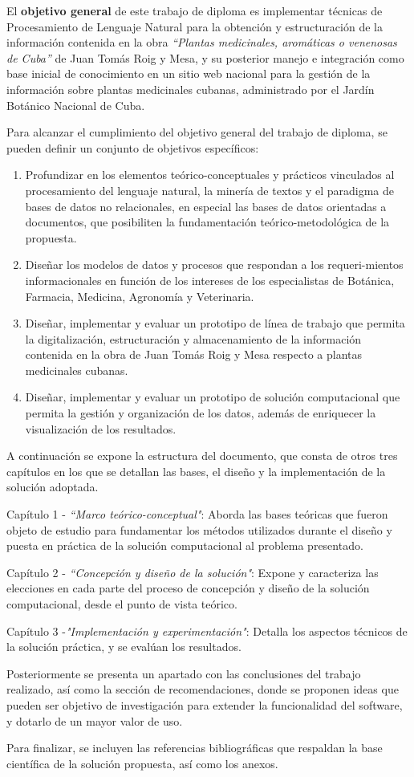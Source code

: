El \textbf{objetivo general} de este trabajo de diploma es implementar técnicas 
de Procesamiento de Lenguaje Natural para la obtención y estructuración de la información 
contenida en la obra \textit{``Plantas medicinales, aromáticas o venenosas de Cuba''} de 
Juan Tomás Roig y Mesa, y su posterior manejo e integración como base inicial de conocimiento 
en un sitio web nacional para la gestión de la información sobre plantas medicinales cubanas, 
administrado por el Jardín Botánico Nacional de Cuba.

Para alcanzar el cumplimiento del objetivo general del trabajo de diploma, se pueden 
definir un conjunto de objetivos específicos:
\begin{enumerate}
    \item Profundizar en los elementos teórico-conceptuales y prácticos vinculados al 
    procesamiento del lenguaje natural, la minería de textos y el paradigma de 
    bases de datos no relacionales, en especial las bases de datos orientadas 
    a documentos, que posibiliten la fundamentación teórico-metodológica de la propuesta.
    \item Diseñar los modelos de datos y procesos que respondan a los requeri-mientos 
    informacionales en función de los intereses de los especialistas de Botánica, 
    Farmacia, Medicina, Agronomía y Veterinaria.
    \item Diseñar, implementar y evaluar un prototipo de línea de trabajo que permita 
    la digitalización, estructuración y almacenamiento de la información contenida 
    en la obra de Juan Tomás Roig y Mesa respecto a plantas medicinales cubanas.
    \item Diseñar, implementar y evaluar un prototipo de solución computacional que 
    permita la gestión y organización de los datos, además de enriquecer la visualización 
    de los resultados.
\end{enumerate}

A continuación se expone la estructura del documento, que consta de otros tres capítulos 
en los que se detallan las bases, el diseño y la implementación de la solución adoptada.

Capítulo 1 - \textit{``Marco teórico-conceptual"}: Aborda las bases teóricas que fueron 
objeto de estudio para fundamentar los métodos utilizados durante el diseño y puesta en 
práctica de la solución computacional al problema presentado.

Capítulo 2 - \textit{``Concepción y diseño de la solución"}: Expone y caracteriza las 
elecciones en cada parte del proceso de concepción y diseño de la solución computacional, 
desde el punto de vista teórico.

Capítulo 3 -\textit{"Implementación y experimentación"}: Detalla los aspectos técnicos 
de la solución práctica, y se evalúan los resultados.

Posteriormente se presenta un apartado con las conclusiones del trabajo realizado, 
así como la sección de recomendaciones, donde se proponen ideas que pueden ser objetivo 
de investigación para extender la funcionalidad del software, y dotarlo de un mayor 
valor de uso.

Para finalizar, se incluyen las referencias bibliográficas que respaldan la base 
científica de la solución propuesta, así como los anexos.